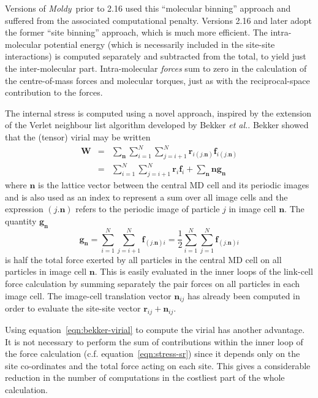 \documentclass[a4paper,twoside]{report}
\providecommand{\bm}[1]{\mathbf{#1}}
\newcommand{\moldy}{\emph{Moldy}}
\begin{document}
Versions of \moldy\ prior to 2.16 used this ``molecular
binning'' approach and suffered from the associated computational
penalty. Versions 2.16 and later adopt the former ``site binning''
approach, which is much more efficient.  The intra-molecular potential
energy (which is necessarily included in the site-site interactions)
is computed separately and subtracted from the total, to yield just
the inter-molecular part.  Intra-molecular \emph{forces} sum to zero
in the calculation of the centre-of-mass forces and molecular torques,
just as with the reciprocal-space contribution to the forces.  

The internal stress is computed using a novel approach, inspired by
the extension of the Verlet neighbour list algorithm developed by
Bekker \emph{et al.}\cite{bekker:95}.  Bekker showed that the (tensor)
virial may be written
\begin{eqnarray}
  \label{eqn:bekker-virial}
  \bm{W} &=& \sum_{\bm{n}}\sum_{i=1}^{N} \sum_{j=i+1}^{N}
  \bm{r}_{i(j.\bm{n})}\bm{f}_{i(j.\bm{n})} \nonumber\\
         &=& \sum_{i=1}^{N} \sum_{j=i+1}^{N}
  \bm{r}_{i}\bm{f}_{i} + \sum_{\bm{n}} \bm{n}\bm{g}_{\bm{n}}
\end{eqnarray}
where $\bm{n}$ is the lattice vector between the central MD cell and
its periodic images and is also used as an index to represent a sum
over all image cells and the expression $(j.\bm{n})$ refers to
the periodic image of particle $j$ in image cell $\bm{n}$.  The
quantity $\bm{g}_{\bm{n}}$
\begin{equation}
  \label{eqn:bekker-g}
  \bm{g}_{\bm{n}} = \sum_{i=1}^{N} \sum_{j=i+1}^{N}\bm{f}_{(j.\bm{n})i} = 
  \frac{1}{2} \sum_{i=1}^{N} \sum_{j=1}^{N}\bm{f}_{(j.\bm{n})i}
\end{equation}
is half the total force exerted by all particles in the central MD
cell on all particles in image cell $\bm{n}$.  This is easily
evaluated in the inner loops of the link-cell force calculation by
summing separately the pair forces on all particles in each image cell. The
image-cell translation vector $\bm{n}_{ij}$ has already been computed in
order to evaluate the site-site vector $\bm{r}_{ij} +\bm{n}_{ij}$.

Using equation~\ref{eqn:bekker-virial} to compute the virial has
another advantage. It is not necessary to perform the sum of
contributions within the inner loop of the force calculation (c.f.
equation~\ref{eqn:stress-sr}) since it depends only on the site
co-ordinates and the total force acting on each site.  This gives a
considerable reduction in the number of computations in the costliest
part of the whole calculation.
\end{document}

